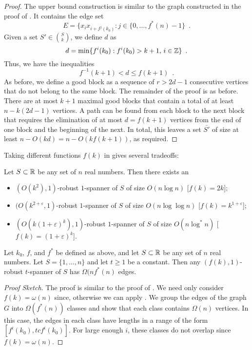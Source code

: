 \documentclass{patmorin}
\begin{document}
\begin{proof}
The upper bound construction is similar to the graph constructed in the
proof of .  It contains the edge set
\[
    E = \{x_ix_{i+f^{j}(k_0)} : j\in\{0,\ldots,f^*(n)-1\} \enspace .
\] 
Given a set $S'\in \binom{S}{k}$, we define $d$ as
\[
   d=\min\{f^i(k_0) : f^i(k_0)> k+1,\, i\in\mathbb{Z}\} \enspace .
\]
Thus, we have the inequalities
\[
     f^{-1}(k+1) < d \le f(k+1) \enspace .
\]
As before, we define a good block as a sequence of $r>2d-1$ consecutive
vertices that do not belong to the same block.  The remainder of the
proof is as before.   There are at most $k+1$ maximal good blocks that
contain a total of at least $n-k(2d-1)$ vertices.  A path can be found
from each block to the next block that requires the elimination of at
most $d=f(k+1)$ vertices from the end of one block and the beginning of
the next.  In total, this leaves a set $\bar{S'}$ of size at least
$n-O(kd) = n - O(kf(k+1))$, as required.
\end{proof}

Taking different functions $f(k)$ in  gives several tradeoffs:

\begin{cor}
Let $S\subset \mathbb{R}$ be any set of $n$ real numbers.  Then there exists an
\begin{itemize}
  \item $(O(k^2),1)$-robust $1$-spanner of $S$ of size $O(n\log n)$
  [$f(k)=2k$];
  \item $(O(k^{2+\varepsilon},1)$-robust $1$-spanner of $S$ of size
  $O(n\log\log n)$ [$f(k)=k^{1+\varepsilon}$];
  \item $(O(k(1+\varepsilon)^k),1)$-robust $1$-spanner of $S$ of size
  $O(n\log^* n)$ [$f(k)=(1+\varepsilon)^k$].
\end{itemize}
\end{cor}


\begin{thm}
Let $k_0$, $f$, and $f^*$ be defined as above, and let $S\subset \mathbb{R}$
be any set of $n$ real numbers.  Let $S=\{1,\ldots,n\}$ and let $t\ge
1$ be a constant.  Then any $(f(k),1)$-robust $t$-spanner of $S$ has
$\Omega(nf^*(n)$ edges.
\end{thm}

\begin{proof}[Proof Sketch]
The proof is similar to the proof of .
We need only consider $f(k)=\omega(n)$ since, otherwise we can apply
.  We group the edges of the graph $G$ into
$\Omega(f^*(n))$ classes and show that each class contains $\Omega(n)$
vertices.  In this case, the edges in each class have lengths in a
range of the form $[f^i(k_0),tcf^{i}(k_0)]$.  For large enough $i$,
these classes do not overlap since $f(k)=\omega(n)$.
\end{proof}
\end{document}
